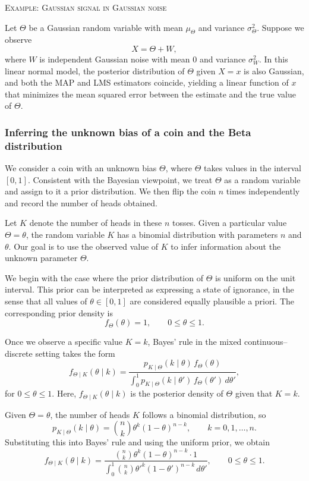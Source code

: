\bigskip
\textsc{Example: Gaussian signal in Gaussian noise}

Let \(\Theta\) be a Gaussian random variable with mean \(\mu_{\Theta}\) and variance \(\sigma_{\Theta}^{2}\).  
Suppose we observe
\[
X = \Theta + W,
\]
where \(W\) is independent Gaussian noise with mean \(0\) and variance \(\sigma_{W}^{2}\).  
In this linear normal model, the posterior distribution of \(\Theta\) given \(X = x\) is also Gaussian, and both the MAP and LMS estimators coincide, yielding a linear function of \(x\) that minimizes the mean squared error between the estimate and the true value of \(\Theta\).


\subsubsection{Inferring the unknown bias of a coin and the Beta distribution}

We consider a coin with an unknown bias \(\Theta\), where \(\Theta\) takes values in the interval \([0,1]\).  
Consistent with the Bayesian viewpoint, we treat \(\Theta\) as a random variable and assign to it a prior distribution.  
We then flip the coin \(n\) times independently and record the number of heads obtained.  

Let \(K\) denote the number of heads in these \(n\) tosses.  
Given a particular value \(\Theta = \theta\), the random variable \(K\) has a binomial distribution with parameters \(n\) and \(\theta\).  
Our goal is to use the observed value of \(K\) to infer information about the unknown parameter \(\Theta\).  

We begin with the case where the prior distribution of \(\Theta\) is uniform on the unit interval.  
This prior can be interpreted as expressing a state of ignorance, in the sense that all values of \(\theta \in [0,1]\) are considered equally plausible a priori.  
The corresponding prior density is
\[
f_{\Theta}(\theta) = 1,
\qquad
0 \leq \theta \leq 1.
\]

Once we observe a specific value \(K = k\), Bayes' rule in the mixed continuous–discrete setting takes the form
\[
f_{\Theta \mid K}(\theta \mid k)
=
\frac{p_{K \mid \Theta}(k \mid \theta)\,f_{\Theta}(\theta)}
{\int_{0}^{1} p_{K \mid \Theta}(k \mid \theta')\,f_{\Theta}(\theta')\,d\theta'},
\]
for \(0 \leq \theta \leq 1\).  
Here, \(f_{\Theta \mid K}(\theta \mid k)\) is the posterior density of \(\Theta\) given that \(K = k\).  

Given \(\Theta = \theta\), the number of heads \(K\) follows a binomial distribution, so
\[
p_{K \mid \Theta}(k \mid \theta)
=
\binom{n}{k} \theta^{k} (1 - \theta)^{n-k},
\qquad
k = 0,1,\ldots,n.
\]
Substituting this into Bayes' rule and using the uniform prior, we obtain
\[
f_{\Theta \mid K}(\theta \mid k)
=
\frac{\binom{n}{k} \theta^{k} (1 - \theta)^{n-k} \cdot 1}
{\int_{0}^{1} \binom{n}{k} \theta'^{k} (1 - \theta')^{n-k}\,d\theta'},
\qquad
0 \leq \theta \leq 1.
\]


